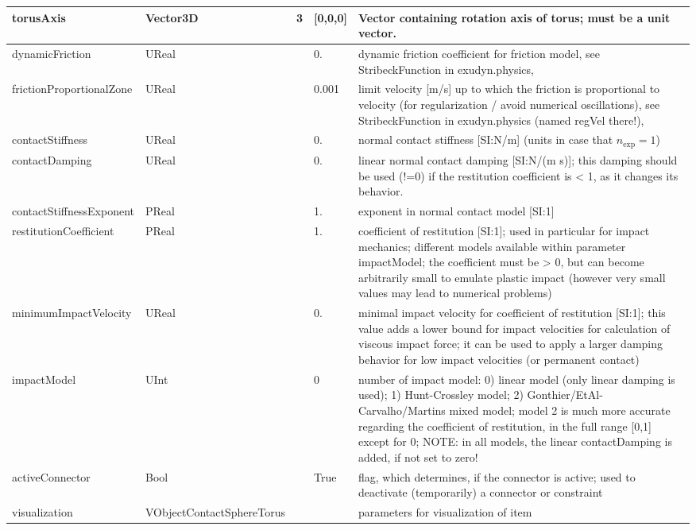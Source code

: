 \begin{center}
\begin{longtable}{| p{4.5cm} | p{2.5cm} | p{0.5cm} | p{2.5cm} | p{6cm} |}
    torusAxis &     Vector3D &     3 &     [0,0,0] &     Vector containing rotation axis of torus; must be a unit vector.\\ \hline
    dynamicFriction &     UReal &      &     0. &     dynamic friction coefficient for friction model, see StribeckFunction in exudyn.physics, {sec:module:physics}\\ \hline
    frictionProportionalZone &     UReal &      &     0.001 &     limit velocity [m/s] up to which the friction is proportional to velocity (for regularization / avoid numerical oscillations), see StribeckFunction in exudyn.physics (named regVel there!), {sec:module:physics}\\ \hline
    contactStiffness &     UReal &      &     0. &     normal contact stiffness [SI:N/m] (units in case that $n_\mathrm{exp}=1$)\\ \hline
    contactDamping &     UReal &      &     0. &     linear normal contact damping [SI:N/(m s)]; this damping should be used (!=0) if the restitution coefficient is < 1, as it changes its behavior.\\ \hline
    contactStiffnessExponent &     PReal &      &     1. &     exponent in normal contact model [SI:1]\\ \hline
    restitutionCoefficient &     PReal &      &     1. &     coefficient of restitution [SI:1]; used in particular for impact mechanics; different models available within parameter impactModel; the coefficient must be > 0, but can become arbitrarily small to emulate plastic impact (however very small values may lead to numerical problems)\\ \hline
    minimumImpactVelocity &     UReal &      &     0. &     minimal impact velocity for coefficient of restitution [SI:1]; this value adds a lower bound for impact velocities for calculation of viscous impact force; it can be used to apply a larger damping behavior for low impact velocities (or permanent contact)\\ \hline
    impactModel &     UInt &      &     0 &      number of impact model: 0) linear model (only linear damping is used); 1) Hunt-Crossley model; 2) Gonthier/EtAl-Carvalho/Martins mixed model; model 2 is much more accurate regarding the coefficient of restitution, in the full range [0,1] except for 0; NOTE: in all models, the linear contactDamping is added, if not set to zero!\\ \hline
    activeConnector &     Bool &      &     True &     flag, which determines, if the connector is active; used to deactivate (temporarily) a connector or constraint\\ \hline
    visualization &     VObjectContactSphereTorus &      &      &     parameters for visualization of item\\ \hline
\end{longtable}
\end{center}

